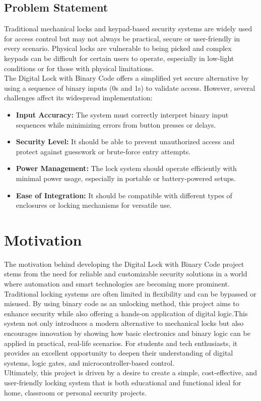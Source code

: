 \subsection{Problem Statement} Traditional mechanical locks and keypad-based security systems are widely used for access control but may not always be practical, secure or user-friendly in every scenario. Physical locks are vulnerable to being picked and complex keypads can be difficult for certain users to operate, especially in low-light conditions or for those with physical limitations.\\
The Digital Lock with Binary Code offers a simplified yet secure alternative by using a sequence of binary inputs (0s and 1s) to validate access. However, several challenges affect its widespread implementation:
\begin{itemize}
    \item \textbf{Input Accuracy:} The system must correctly interpret binary input sequences while minimizing errors from button presses or delays.
    \item \textbf{Security Level:} It should be able to prevent unauthorized access and protect against guesswork or brute-force entry attempts.
    \item \textbf{Power Management:} The lock system should operate efficiently with minimal power usage, especially in portable or battery-powered setups.
    \item \textbf{	Ease of Integration:} It should be compatible with different types of enclosures or locking mechanisms for versatile use.\cite{1.1.1}\\

\end{itemize}

\section{Motivation}
The motivation behind developing the Digital Lock with Binary Code project stems from the need for reliable and customizable security solutions in a world where automation and smart technologies are becoming more prominent. Traditional locking systems are often limited in flexibility and can be bypassed or misused. By using binary code as an unlocking method, this project aims to enhance security while also offering a hands-on application of digital logic.This system not only introduces a modern alternative to mechanical locks but also encourages innovation by showing how basic electronics and binary logic can be applied in practical, real-life scenarios. For students and tech enthusiasts, it provides an excellent opportunity to deepen their understanding of digital systems, logic gates, and microcontroller-based control.\\
\noindent Ultimately, this project is driven by a desire to create a simple, cost-effective, and user-friendly locking system that is both educational and functional  ideal for home, classroom or personal security projects.\cite{1.2}

